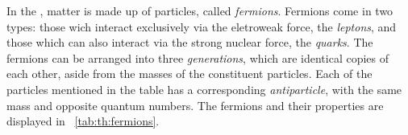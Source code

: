  In the \SM, matter is made up of \SpinHalf particles, called \emph{fermions}. Fermions come in two types: those wich interact exclusively via the eletroweak force, the \emph{leptons}, and those which can also interact via the strong nuclear force, the \emph{quarks}. The fermions can be arranged into three \emph{generations}, which are identical copies of each other, aside from the masses of the constituent particles. 
Each of the particles mentioned in the table has a corresponding \emph{antiparticle}, with the same mass and opposite quantum numbers.
The \SM fermions and their properties are displayed in \Tab~\ref{tab:th:fermions}.

\begin{table}[h!]
 \caption{The fundamental \SM particles which constitute all matter in the universe are presented. The mass $m$ and electric charge $q$ are indicated for each particle.} 
\label{tab:th:fermions}
\end{table}

